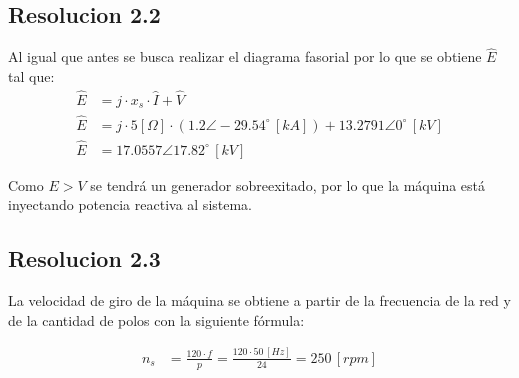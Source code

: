 \documentclass[
  11pt,
  letterpaper,
   addpoints,
   answers
  ]{exam}
\begin{document}
\begin{questions}
\begin{solution}
\subsection*{Resolucion 2.2}
Al igual que antes se busca realizar el diagrama fasorial por lo que se obtiene $\hat{E}$ tal que:
\begin{align}
    \hat{E} &= j \cdot x_s \cdot \hat{I} + \hat{V} \\
    \hat{E} &= j \cdot 5[\Omega] \cdot (1.2 \angle -29.54^\circ \, [kA]) + 13.2791 \angle 0^\circ \, [kV] \\
    \hat{E} &= 17.0557 \angle 17.82^\circ \, [kV]
    \end{align}
    \begin{center}
\end{center}
    Como $E > V$ se tendrá un generador sobreexitado, por lo que la máquina está inyectando potencia reactiva al sistema.
    \subsection*{Resolucion 2.3}
    La velocidad de giro de la máquina se obtiene a partir de la frecuencia de la red y de la cantidad de polos con la siguiente fórmula:

\begin{align}
n_s &= \frac{120 \cdot f}{p} = \frac{120 \cdot 50 \, [Hz]}{24} = 250 \, [rpm]
\end{align}


\end{solution}
\end{questions}
\end{document}
